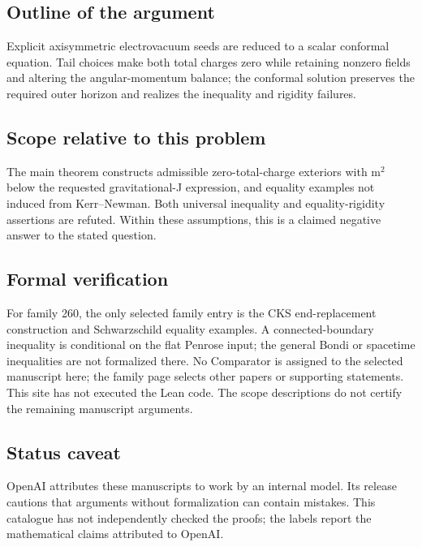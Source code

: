 \documentclass[11pt]{article}
\begin{document}
\subsection{Outline of the argument}
Explicit axisymmetric electrovacuum seeds are reduced to a scalar conformal equation. Tail choices make both total charges zero while retaining nonzero fields and altering the angular-momentum balance; the conformal solution preserves the required outer horizon and realizes the inequality and rigidity failures.

\subsection{Scope relative to this problem}
The main theorem constructs admissible zero-total-charge exteriors with m\({}^{2}\) below the requested gravitational-J expression, and equality examples not induced from Kerr–Newman. Both universal inequality and equality-rigidity assertions are refuted. Within these assumptions, this is a claimed negative answer to the stated question.

\subsection{Formal verification}
For family 260, the only selected family entry is the CKS end-replacement construction and Schwarzschild equality examples. A connected-boundary inequality is conditional on the flat Penrose input; the general Bondi or spacetime inequalities are not formalized there. No Comparator is assigned to the selected manuscript here; the family page selects other papers or supporting statements. This site has not executed the Lean code. The scope descriptions do not certify the remaining manuscript arguments.

\subsection{Status caveat}
OpenAI attributes these manuscripts to work by an internal model. Its release cautions that arguments without formalization can contain mistakes. This catalogue has not independently checked the proofs; the labels report the mathematical claims attributed to OpenAI.
\end{document}
